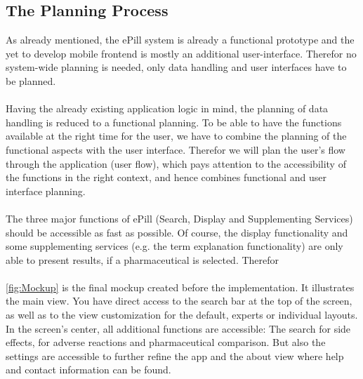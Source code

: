 \subsection{The Planning Process}
\label{subsec:Planning}
As already mentioned, the ePill system is already a functional prototype and the yet to develop mobile frontend is mostly an additional user-interface. Therefor no system-wide planning is needed, only data handling and user interfaces have to be planned.
\\
\\
Having the already existing application logic in mind, the planning of data handling is reduced to a functional planning. To be able to have the functions available at the right time for the user, we have to combine the planning of the functional aspects with the user interface. Therefor we will plan the user's flow through the application (user flow), which pays attention to the accessibility of the functions in the right context, and hence combines functional and user interface planning.
\\
\\
The three major functions of ePill (Search, Display and Supplementing Services) should be accessible as fast as possible. Of course, the display functionality and some supplementing services (e.g. the term explanation functionality) are only able to present results, if a pharmaceutical is selected. Therefor 
\\
\\
\ref{fig:Mockup} is the final mockup created before the implementation. It illustrates the main view. You have direct access to the search bar at the top of the screen, as well as to the view customization for the default, experts or individual layouts. In the screen's center, all additional functions are accessible: The search for side effects, for adverse reactions and pharmaceutical comparison. But also the settings are accessible to further refine the app and the about view where help and contact information can be found.
\\
